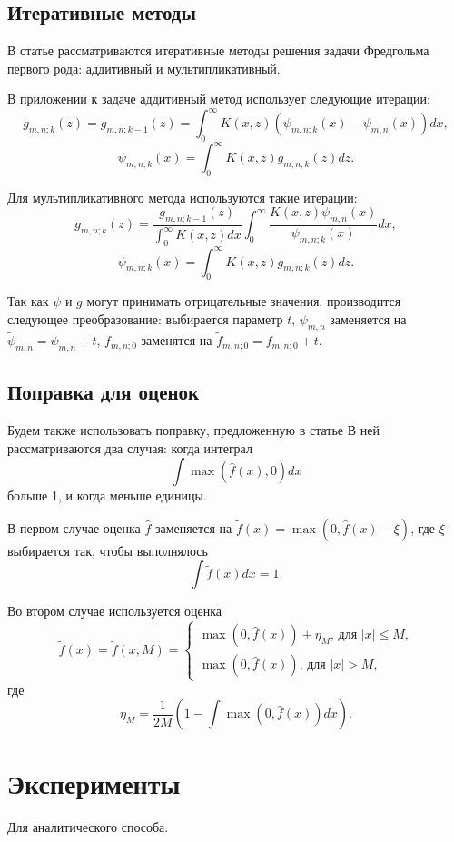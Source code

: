 \documentclass[12pt, a4paper]{report}
\begin{document}
\section{Итеративные методы}
В статье \cite{fredholm-integrals} рассматриваются итеративные методы решения задачи Фредгольма
первого рода: аддитивный и мультипликативный.

В приложении к задаче аддитивный метод использует следующие итерации:
\[
  g_{m,n;k}(z) = g_{m,n;k-1}(z) = \int_0^\infty K(x, z) (\psi_{m,n;k}(x) - \psi_{m,n}(x)) dx
,\]
\[
  \psi_{m,n;k}(x) = \int_0^\infty K(x, z) g_{m,n;k}(z) dz
.\]

Для мультипликативного метода используются такие итерации:
\[
  g_{m,n;k}(z) = \frac{g_{m,n;k-1}(z)}{\int_{0}^\infty K(x, z) dx} \int_{0}^\infty \frac{K(x, z) \psi_{m,n}(x)}{\psi_{m,n;k}(x)} dx
,\]
\[
  \psi_{m,n;k}(x) = \int_0^\infty K(x, z) g_{m,n;k}(z) dz
.\]

Так как $\psi$ и $g$ могут принимать отрицательные значения, производится
следующее преобразование: выбирается параметр $t$, $\psi_{m,n}$ заменяется
на $\tilde{\psi}_{m,n} = \psi_{m,n} + t$, $f_{m,n;0}$ заменятся на
$\tilde{f}_{m,n;0} = f_{m,n;0} + t$.
%
\section{Поправка для оценок}
Будем также использовать поправку, предложенную в статье \cite{correction-of-density-estimation}
В ней рассматриваются два случая: когда интеграл
\[
  \int \max(\hat{f}(x), 0) dx
\]
больше 1, и когда меньше единицы.

В первом случае оценка $\hat{f}$ заменяется на $\tilde{f}(x) = \max(0, \hat{f}(x) - \xi)$,
где $\xi$ выбирается так, чтобы выполнялось
\[
  \int \tilde{f}(x) dx = 1
.\]

Во втором случае используется оценка
\[
  \tilde{f}(x) = \tilde{f}(x; M) =
  \begin{cases}
    \max(0, \hat{f}(x)) + \eta_M \text{, для $|x| \leqslant M$,} \\
    \max(0, \hat{f}(x)) \text{, для $|x| > M$,}
  \end{cases}
\]
где
\[
  \eta_M = \frac{1}{2M} \left( 1 - \int \max(0, \hat{f}(x)) dx \right)
.\]
\chapter{Эксперименты}
%
Для аналитического способа.
\end{document}
